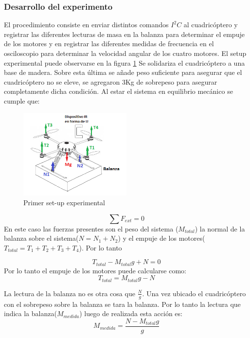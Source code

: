 \documentclass[main]{subfiles}
\begin{document}
\subsubsection*{Desarrollo del experimento}
El procedimiento consiste en enviar distintos comandos $I^2C$ al cuadric\'optero y registrar las diferentes lecturas de masa en la balanza para determinar el empuje de los motores y en registrar las diferentes medidas de frecuencia en el osciloscopio para determinar la velocidad angular de los cuatro motores.
El setup experimental puede observarse en la figura \ref{fig:setup1}
Se solidariza el cuadric\'optero a una base de madera. Sobre esta \'ultima se a\~nade peso suficiente para asegurar que el cuadric\'optero no se eleve, se agregaron 3Kg de sobrepeso para asegurar completamente dicha condici\'on. Al estar el sistema en equilibrio mec\'anico se cumple que:
\begin{figure}
  \vspace{0pt}
  \begin{center}
    \includegraphics[width=0.5\textwidth]{./pics_motores/set1.png}
  \end{center}
  \vspace{-20pt}
  \caption{Primer set-up experimental}
  \label{fig:setup1}
  \vspace{15pt}
\end{figure}
$$
\sum F_{ext}=0
$$
En este caso las fuerzas presentes son el peso del sistema ($M_{total}$) la normal de la balanza sobre el sistema($N=N_1+N_2$) y el empuje de los motores($T_{total}=T_1+T_2+T_3+T_4$). Por lo tanto

$$
T_{total}-M_{total}g+N=0
$$
Por lo tanto el empuje de los motores puede calcularse como:
$$
T_{total}=M_{total}g-N
$$

La lectura de la balanza no es otra cosa que $\frac{N}{g}$.
Una vez ubicado el cuadric\'optero con el sobrepeso sobre la balanza se tara la balanza. Por lo tanto la lectura que indica la balanza($M_{medida}$) luego de realizada esta acci\'on es:
$$
M_{medida}=\frac{N-M_{total}g}{g}
$$
\end{document}
